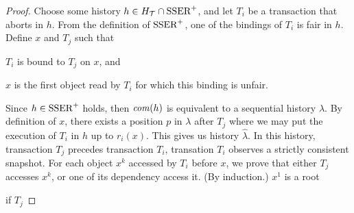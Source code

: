 \begin{proof}
  Choose some history $h \in H_{\mathcal{T}} \inter \SPSER$, and let $T_i$ be a transaction that aborts in $h$.
  From the definition of $\SPSER$, one of the bindings of $T_i$ is fair in $h$.
  Define $x$ and $T_j$ such that
  \begin{inparaenum}
  \item $T_i$ is bound to $T_j$ on $x$, and
  \item $x$ is the first object read by $T_i$ for which this binding is unfair.
  \end{inparaenum}
  
  Since $h \in \SPSER$ holds, then $\committed{h}$ is equivalent to a sequential history $\lambda$.
  By definition of $x$, there exists a position $p$ in $\lambda$ after $T_j$ where we may put the execution of $T_i$ in $h$ up to $r_i(x)$.
  This gives us history $\hat{\lambda}$.
  In this history,
  transaction $T_j$ precedes transaction $T_i$,
  transation $T_i$ observes a strictly consistent snapshot.
  For each object $x^k$ accessed by $T_i$ before $x$, we prove that
  either $T_j$ accesses $x^k$, or one of its dependency access it.
  (By induction.)
  $x^1$ is a root

  if $T_j$
  
  
\end{proof}

